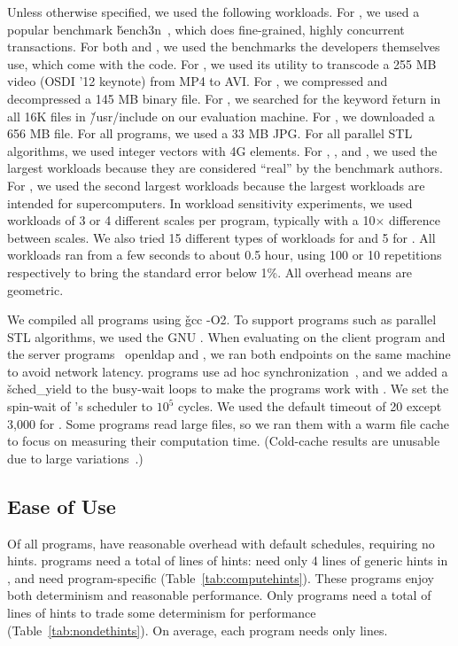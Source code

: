 Unless otherwise specified, we used the following workloads.  For \bdb, we
used a popular benchmark \v{bench3n}~\cite{benchthreen}, which does
fine-grained, highly concurrent transactions. For both \openldap and
\redis, we used the benchmarks the developers themselves use, which come
with the code. For \mplayer, we used its utility \mencoder to transcode a
255 MB video (OSDI '12 keynote) from MP4 to AVI.  For \pbzip, we
compressed and decompressed a 145 MB binary file.  For \pfscan, we searched for
the keyword \v{return} in all 16K files in \v{/usr/include} on our
evaluation machine.  For \aget, we downloaded a 656 MB file. For all
\imagick programs, we used a 33 MB JPG.  For all \nstl
parallel STL algorithms, we used integer vectors with 4G elements.  For
\parsec, \splashx, and \phoenix, we used the largest workloads
because they are considered ``real'' by the benchmark authors.  For \npb, we
used the second largest workloads because the largest workloads are intended 
for
supercomputers. In workload sensitivity experiments, we used workloads of
3 or 4 different scales per program, typically with a 10$\times$ difference 
between
scales.  We also tried 15 different
types of workloads for \redis and 5 for \mplayer.  All workloads ran from
a few seconds to about 0.5 hour, using 100 or 10
repetitions respectively to bring the standard error below 1\%.
All overhead means are geometric.

We compiled all programs using \v{gcc -O2}.  To support
\openmp programs such as parallel STL algorithms, we used the GNU \libgomp.
When evaluating \parrot on the client program \aget and the server programs \
openldap
and \redis, we ran both endpoints on the same machine to avoid network
latency.  \nprogadhocsync programs use ad hoc
synchronization~\cite{syncfinder:osdi10}, and we added a \v{sched\_yield}
to the busy-wait loops to make the programs work with \parrot. We set the
spin-wait of \parrot's scheduler
to $10^5$ cycles.  We used the default \compute timeout of 20 except 3,000
for \ferret.  Some \phoenix programs read large files, so
we ran them with a warm file cache to focus on measuring their computation
time. (Cold-cache results are unusable due to large
variations~\cite{Parrot:github}.)



\subsection{Ease of Use} \label{sec:parrot-use}

Of all \nprog programs, \nprognohints have reasonable overhead with
default schedules, requiring no hints.  \nproglineuphints programs need a 
total of 
\nlineofcomputehints lines of \compute hints: \nproggenericlineuphints
need only 4 lines of generic \compute hints in \libgomp, and
\nprogspecificlineuphints need program-specific \computes
(Table~\ref{tab:computehints}).  These programs enjoy both determinism and
reasonable performance.  Only \nprognondethints programs 
need a total of \nlineofnondethints lines of \nondet hints to
trade some determinism for performance (Table~\ref{tab:nondethints}).
On average, each program needs only \hintsperprog lines.


